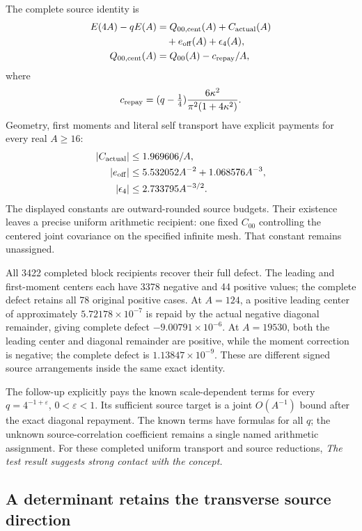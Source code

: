 The complete source identity is
\[
\begin{aligned}
 E(4A)-qE(A)
   &=Q_{00,\rm cent}(A)+C_{\rm actual}(A)\\
   &\quad+e_{\rm off}(A)+\epsilon_4(A),\\
 Q_{00,\rm cent}(A)&=Q_{00}(A)-c_{\rm repay}/A,
\end{aligned}
\]
where
\[
 c_{\rm repay}=(q-\tfrac14)
       \frac{6\kappa^2}{\pi^2(1+4\kappa^2)}.
\]
Geometry, first moments and literal self transport have explicit
payments for every real \(A\geq16\):
\[
\begin{aligned}
 |C_{\rm actual}|&\leq1.969606/A,\\
 |e_{\rm off}|&\leq5.532052A^{-2}
                       +1.068576A^{-3},\\
 |\epsilon_4|&\leq2.733795A^{-3/2}.
\end{aligned}
\]
The displayed constants are outward-rounded source budgets.
Their existence leaves a precise uniform arithmetic recipient:
one fixed \(C_{00}\) controlling the centered joint covariance on the
specified infinite mesh. That constant remains unassigned.

All 3422 completed block recipients recover their full defect.
The leading and first-moment centers each have 3378 negative and 44
positive values; the complete defect retains all 78 original positive
cases. At \(A=124\), a positive leading center of approximately
\(5.72178\times10^{-7}\) is repaid by the actual negative diagonal
remainder, giving complete defect \(-9.00791\times10^{-6}\).
At \(A=19530\), both the leading center and diagonal remainder are
positive, while the moment correction is negative; the complete defect
is \(1.13847\times10^{-9}\). These are different signed source
arrangements inside the same exact identity.

The follow-up explicitly pays the known scale-dependent terms for
every \(q=4^{-1+\varepsilon}\), \(0<\varepsilon<1\). Its sufficient
source target is a joint \(O(A^{-1})\) bound after the exact diagonal
repayment. The known terms have formulas for all \(q\); the unknown
source-correlation coefficient remains a single named arithmetic
assignment. For these completed uniform transport and source
reductions, \emph{The test result suggests strong contact with the
concept.}

\subsection{A determinant retains the transverse source direction}

